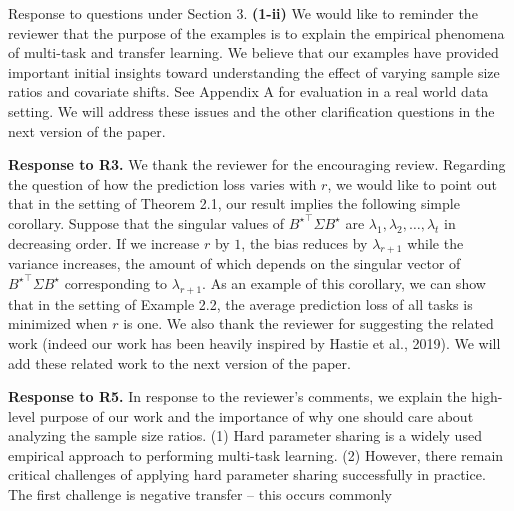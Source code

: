 \documentclass{article}
\begin{document}
	Response to questions under Section 3.
	\textbf{(1-ii)} We would like to reminder the reviewer that the purpose of the examples is to explain the empirical phenomena of multi-task and transfer learning.
	We believe that our examples have provided important initial insights toward understanding the effect of varying sample size ratios and covariate shifts.
	See Appendix A for evaluation in a real world data setting.
	We will address these issues and the other clarification questions in the next version of the paper.

	\textbf{Response to R3.}
	We thank the reviewer for the encouraging review.
	Regarding the question of how the prediction loss varies with $r$, we would like to point out that in the setting of Theorem 2.1, our result implies the following simple corollary.
	Suppose that the singular values of ${B^{\star}}^{\top}\Sigma B^{\star}$ are $\lambda_1, \lambda_2, \dots, \lambda_t$ in decreasing order.
	If we increase $r$ by $1$, the bias reduces by $\lambda_{r+1}$ while the variance increases, the amount of which depends on the singular vector of  ${B^{\star}}^{\top}\Sigma B^{\star}$ corresponding to $\lambda_{r+1}$.
	As an example of this corollary, we can show that in the setting of Example 2.2, the average prediction loss of all tasks is minimized when $r$ is one.
	We also thank the reviewer for suggesting the related work (indeed our work has been heavily inspired by Hastie et al., 2019).
	We will add these related work to the next version of the paper.

	\textbf{Response to R5.}
	In response to the reviewer's comments, we explain the high-level purpose of our work and the importance of why one should care about analyzing the sample size ratios.
	(1) Hard parameter sharing is a widely used empirical approach to performing multi-task learning.
	(2) However, there remain critical challenges of applying hard parameter sharing successfully in practice.
	The first challenge is negative transfer -- this occurs commonly
\end{document}
